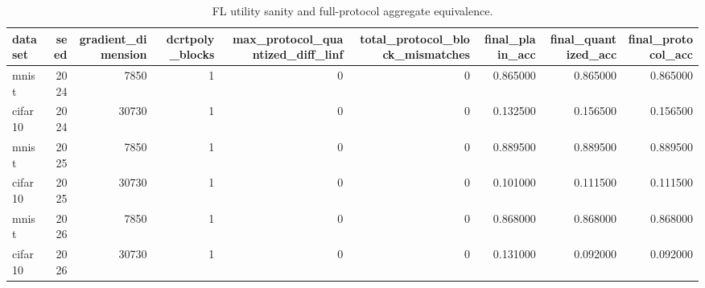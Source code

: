 \begin{table}
\caption{FL utility sanity and full-protocol aggregate equivalence.}
\label{tab:eval-utility}
\begin{tabular}{lrrrrrrrr}
\toprule
dataset & seed & gradient_dimension & dcrtpoly_blocks & max_protocol_quantized_diff_linf & total_protocol_block_mismatches & final_plain_acc & final_quantized_acc & final_protocol_acc \\
\midrule
mnist & 2024 & 7850 & 1 & 0 & 0 & 0.865000 & 0.865000 & 0.865000 \\
cifar10 & 2024 & 30730 & 1 & 0 & 0 & 0.132500 & 0.156500 & 0.156500 \\
mnist & 2025 & 7850 & 1 & 0 & 0 & 0.889500 & 0.889500 & 0.889500 \\
cifar10 & 2025 & 30730 & 1 & 0 & 0 & 0.101000 & 0.111500 & 0.111500 \\
mnist & 2026 & 7850 & 1 & 0 & 0 & 0.868000 & 0.868000 & 0.868000 \\
cifar10 & 2026 & 30730 & 1 & 0 & 0 & 0.131000 & 0.092000 & 0.092000 \\
\bottomrule
\end{tabular}
\end{table}
